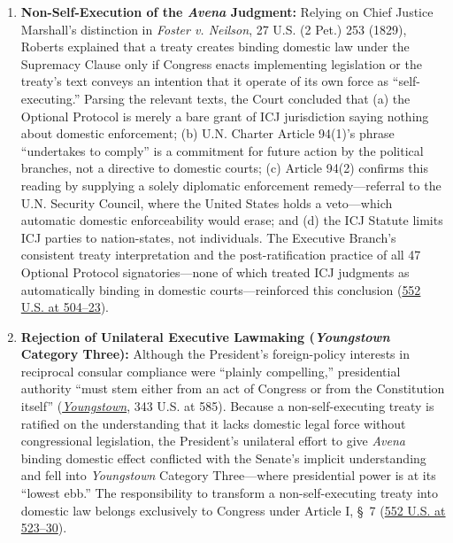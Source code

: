\documentclass[12pt]{article}
\begin{document}
\begin{enumerate}
  \item \textbf{Non-Self-Execution of the \textit{Avena} Judgment:} Relying on Chief Justice Marshall's distinction in \textit{Foster v. Neilson}, 27 U.S. (2 Pet.) 253 (1829), Roberts explained that a treaty creates binding domestic law under the Supremacy Clause only if Congress enacts implementing legislation or the treaty's text conveys an intention that it operate of its own force as ``self-executing.'' Parsing the relevant texts, the Court concluded that (a) the Optional Protocol is merely a bare grant of ICJ jurisdiction saying nothing about domestic enforcement; (b) U.N. Charter Article 94(1)'s phrase ``undertakes to comply'' is a commitment for future action by the political branches, not a directive to domestic courts; (c) Article 94(2) confirms this reading by supplying a solely diplomatic enforcement remedy---referral to the U.N. Security Council, where the United States holds a veto---which automatic domestic enforceability would erase; and (d) the ICJ Statute limits ICJ parties to nation-states, not individuals. The Executive Branch's consistent treaty interpretation and the post-ratification practice of all 47 Optional Protocol signatories---none of which treated ICJ judgments as automatically binding in domestic courts---reinforced this conclusion (\href{https://supreme.justia.com/cases/federal/us/552/491/}{552 U.S. at 504--23}).

  \item \textbf{Rejection of Unilateral Executive Lawmaking (\textit{Youngstown} Category Three):} Although the President's foreign-policy interests in reciprocal consular compliance were ``plainly compelling,'' presidential authority ``must stem either from an act of Congress or from the Constitution itself'' (\href{https://supreme.justia.com/cases/federal/us/343/579/}{\textit{Youngstown}}, 343 U.S. at 585). Because a non-self-executing treaty is ratified on the understanding that it lacks domestic legal force without congressional legislation, the President's unilateral effort to give \textit{Avena} binding domestic effect conflicted with the Senate's implicit understanding and fell into \textit{Youngstown} Category Three---where presidential power is at its ``lowest ebb.'' The responsibility to transform a non-self-executing treaty into domestic law belongs exclusively to Congress under Article I, \S~7 (\href{https://supreme.justia.com/cases/federal/us/552/491/}{552 U.S. at 523--30}).


\end{enumerate}
\end{document}
